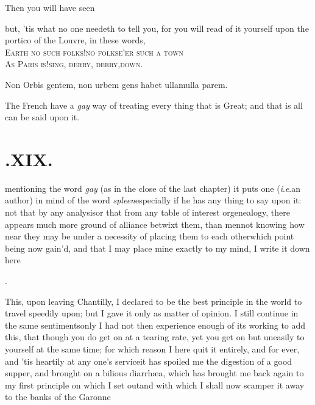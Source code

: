 \documentclass{article}
\begin{document}
\tsh Then you will have seen\tsh

\tsh but, ’tis what no one needeth to tell you,
for you will read of it yourself upon the portico of the
Louvre, in these words,\\[3pt]
\lower-3pt\hbox{\ast} \textsc{Earth no such folks!\tsk no folks\bnq\quad e’er such a
town}\\
\textsc{As Paris is!\tsk sing, derry, derry,\bnq\quad down}.

\bgroup\footnotesize
\noindent\lower-3pt\hbox{\ast} Non Orbis gentem, non urbem gens habet
ullam\bnq\qquad\tsh\tsh\tsh\tsh ulla parem.
\par\egroup
\etp{}
\newpage
\noindent
The French have a \textit{gay} way of treating every thing
that is Great; and that is all can be said upon it.



\section{.\enspace XIX.}

 mentioning the word \textit{gay} (as in\break
the close of the last chapter) it puts one (\textit{i}.\@ \textit{e}.\@ an
author) in mind of the word \textit{spleen}\tsh especially
if he has any thing to say upon it: not that by any
analysis\break\tsk or that from any table of interest or\break genealogy,
there appears much more ground of alliance betwixt them, than
\break
men\tsk not knowing how near they may be
under a necessity of placing them to each other\tsh which
point being now gain’d, and that I may place mine exactly to
my mind, I write it down here\tsh

\bigskip
\centerline{.}

This, upon leaving Chantilly, I declared to be the best principle in the world to
travel speedily upon; but I gave it only as matter of opinion. I still continue in
the same sentiments\tsk\break only I had not then experience enough of its working to add
this, that though you do get on at a tearing rate, yet you get on but uneasily to
yourself at the same time; for which reason I here quit it entirely, and for ever,
and ’tis heartily at any one’s service\tsk it has spoiled me the digestion of a good
supper, and brought on a bilious diarrhæa\sic, which has brought me back again to my
first principle on which I set out\tsh and with which I shall now scamper it away to
the banks of the Garonne\tsk
\end{document}
